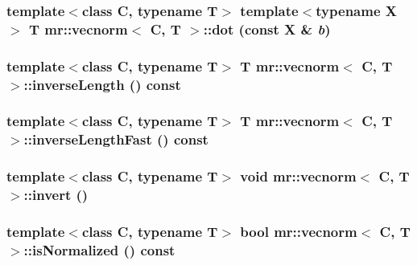 \subsubsection{\setlength{\rightskip}{0pt plus 5cm}template$<$class C, typename T$>$ template$<$typename X$>$ T {\bf mr::vecnorm}$<$ C, T $>$::dot (const X \& {\em b})\hspace{0.3cm}{\tt  [inline]}}\label{structmr_1_1vecnorm_z55_2}


\subsubsection{\setlength{\rightskip}{0pt plus 5cm}template$<$class C, typename T$>$ T {\bf mr::vecnorm}$<$ C, T $>$::inverse\-Length () const\hspace{0.3cm}{\tt  [inline]}}\label{structmr_1_1vecnorm_a4}


\subsubsection{\setlength{\rightskip}{0pt plus 5cm}template$<$class C, typename T$>$ T {\bf mr::vecnorm}$<$ C, T $>$::inverse\-Length\-Fast () const\hspace{0.3cm}{\tt  [inline]}}\label{structmr_1_1vecnorm_a5}


\subsubsection{\setlength{\rightskip}{0pt plus 5cm}template$<$class C, typename T$>$ void {\bf mr::vecnorm}$<$ C, T $>$::invert ()\hspace{0.3cm}{\tt  [inline]}}\label{structmr_1_1vecnorm_z56_0}


\subsubsection{\setlength{\rightskip}{0pt plus 5cm}template$<$class C, typename T$>$ bool {\bf mr::vecnorm}$<$ C, T $>$::is\-Normalized () const}\label{structmr_1_1vecnorm_z56_3}


